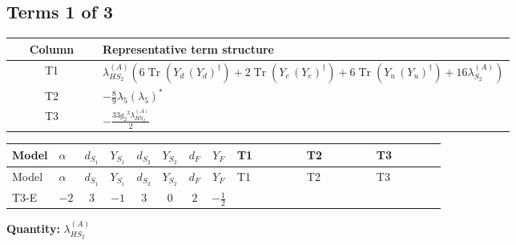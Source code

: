\documentclass[8pt]{article}
\begin{document}
\begin{landscape}
\subsection*{Terms 1 of 3}
\begin{center}
\begin{tabular}{@{}c >{\raggedright\arraybackslash}p{0.82\linewidth}@{}}
\toprule
Column & Representative term structure \\
\midrule
T1 & \(\displaystyle {\lambda_{HS_2}^{(A)}} (6 \operatorname{Tr}\!\left({Y_d}\,\left({Y_d}\right)^{\dagger}\right)+2 \operatorname{Tr}\!\left({Y_e}\,\left({Y_e}\right)^{\dagger}\right)+6 \operatorname{Tr}\!\left({Y_u}\,\left({Y_u}\right)^{\dagger}\right)+16 {\lambda_{S_2}^{(A)}})\) \\
\midrule
T2 & \(\displaystyle -\frac{8}{9} {\lambda_5} \left({\lambda_5}\right)^{*}\) \\
\midrule
T3 & \(\displaystyle -\frac{33 {g_2}^2 {\lambda_{HS_2}^{(A)}}}{2}\) \\
\midrule
\bottomrule
\end{tabular}
\end{center}
\smallskip
\tiny
\begin{longtable}{@{}llcccccc >{\raggedright\arraybackslash}p{0.21\linewidth} >{\raggedright\arraybackslash}p{0.21\linewidth} >{\raggedright\arraybackslash}p{0.21\linewidth}@{}}
\toprule
Model & $\alpha$ & $d_{S_1}$ & $Y_{S_1}$ & $d_{S_2}$ & $Y_{S_2}$ & $d_F$ & $Y_F$ & T1 & T2 & T3 \\
\midrule
\endfirsthead
\toprule
Model & $\alpha$ & $d_{S_1}$ & $Y_{S_1}$ & $d_{S_2}$ & $Y_{S_2}$ & $d_F$ & $Y_F$ & T1 & T2 & T3 \\
\midrule
\endhead
T3-E & $-2$ & $3$ & $-1$ & $3$ & $0$ & $2$ & $-\frac{1}{2}$ & \scriptsize\adjustbox{max width=\linewidth}{$\begin{gathered} {\lambda_{HS_2}^{(A)}} (6 \operatorname{Tr}\!\left({Y_d}\,\left({Y_d}\right)^{\dagger}\right)+2 \operatorname{Tr}\!\left({Y_e}\,\left({Y_e}\right)^{\dagger}\right)+6 \operatorname{Tr}\!\left({Y_u}\,\left({Y_u}\right)^{\dagger}\right)+16 {\lambda_{S_2}^{(A)}})\end{gathered}$} & \scriptsize\adjustbox{max width=\linewidth}{$\begin{gathered} -\frac{8}{9} {\lambda_5} \left({\lambda_5}\right)^{*}\end{gathered}$} & \scriptsize\adjustbox{max width=\linewidth}{$\begin{gathered} -\frac{33 {g_2}^2 {\lambda_{HS_2}^{(A)}}}{2}\end{gathered}$} \\
\midrule
\bottomrule
\end{longtable}
\clearpage
\noindent\textbf{Quantity: }$\lambda_{HS_2}^{(A)}$\par\smallskip

\end{landscape}
\end{document}
